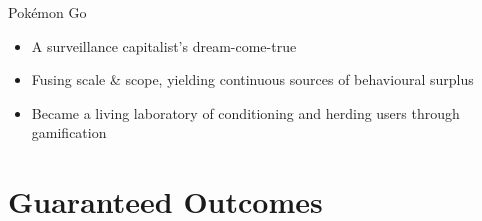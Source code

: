 \documentclass[aspectratio=169]{beamer}
\begin{document}
    {%
    \begin{frame}{Pokémon Go}
        \begin{itemize}
            \item A surveillance capitalist's dream-come-true
            \item Fusing scale \& scope, yielding continuous sources of behavioural
                surplus
            \item Became a living laboratory of conditioning and herding users
                through gamification
        \end{itemize}
    \end{frame}
    }

    \section{Guaranteed Outcomes}%
    \label{sec:guaranteed_outcomes}
\end{document}
